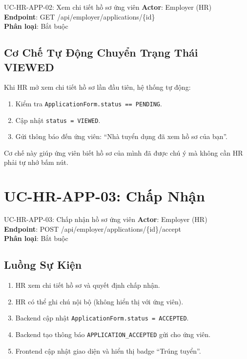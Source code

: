 \documentclass[12pt, a4paper]{report}
\begin{document}
\begin{requirementbox}{UC-HR-APP-02: Xem chi tiết hồ sơ ứng viên}
\textbf{Actor}: Employer (HR) \\
\textbf{Endpoint}: GET /api/employer/applications/\{id\} \\
\textbf{Phân loại}: Bắt buộc
\end{requirementbox}

\subsection{Cơ Chế Tự Động Chuyển Trạng Thái VIEWED}

Khi HR mở xem chi tiết hồ sơ lần đầu tiên, hệ thống tự động:
\begin{enumerate}
    \item Kiểm tra \texttt{ApplicationForm.status == PENDING}.
    \item Cập nhật \texttt{status = VIEWED}.
    \item Gửi thông báo đến ứng viên: ``Nhà tuyển dụng đã xem hồ sơ của bạn''.
\end{enumerate}

Cơ chế này giúp ứng viên biết hồ sơ của mình đã được chú ý mà không cần HR phải tự nhớ bấm nút.

\section{UC-HR-APP-03: Chấp Nhận}

\begin{requirementbox}{UC-HR-APP-03: Chấp nhận hồ sơ ứng viên}
\textbf{Actor}: Employer (HR) \\
\textbf{Endpoint}: POST /api/employer/applications/\{id\}/accept \\
\textbf{Phân loại}: Bắt buộc
\end{requirementbox}

\subsection{Luồng Sự Kiện}

\begin{enumerate}
    \item HR xem chi tiết hồ sơ và quyết định chấp nhận.
    \item HR có thể ghi chú nội bộ (không hiển thị với ứng viên).
    \item Backend cập nhật \texttt{ApplicationForm.status = ACCEPTED}.
    \item Backend tạo thông báo \texttt{APPLICATION\_ACCEPTED} gửi cho ứng viên.
    \item Frontend cập nhật giao diện và hiển thị badge ``Trúng tuyển''.
\end{enumerate}
\end{document}
